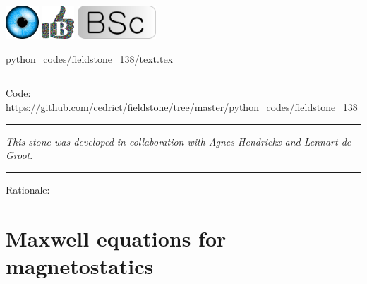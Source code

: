 \includegraphics[height=1.25cm]{images/pictograms/visualisation}
\includegraphics[height=1.25cm]{images/pictograms/benchmark}
\includegraphics[height=1.25cm]{images/pictograms/bsc}



\begin{flushright} {\tiny {\color{gray} python\_codes/fieldstone\_138/text.tex}} \end{flushright}



\par\noindent\rule{\textwidth}{0.4pt}

\begin{center}
\inpython
Code: \url{https://github.com/cedrict/fieldstone/tree/master/python_codes/fieldstone_138}
\end{center}

\par\noindent\rule{\textwidth}{0.4pt}

{\sl This stone was developed in collaboration with Agnes Hendrickx
and Lennart de Groot}. 

\par\noindent\rule{\textwidth}{0.4pt}



Rationale:






\section*{Maxwell equations for magnetostatics}






